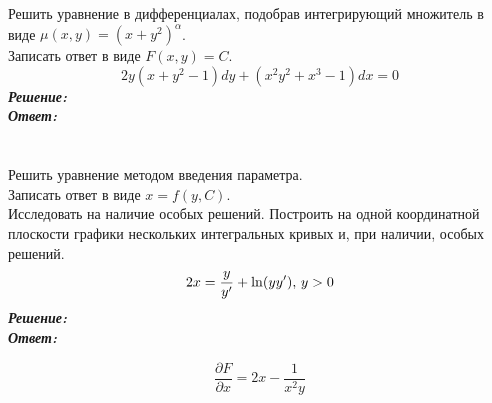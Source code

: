 \documentclass[a5paper, 10pt]{article}
\theoremstyle{definition}
\theoremstyle{plain}
\theoremstyle{remark}
\begin{document}
\newpage
\section{}
Решить уравнение в дифференциалах, подобрав интегрирующий множитель в виде $\mu (x, y) = (x+y^2)^{\alpha}$.\\
Записать ответ в виде $F(x, y) = C$.
\begin{equation*}
2y(x + y^2 - 1) dy + (x^2y^2+x^3 - 1)dx = 0
\end{equation*}
\textit{\textbf{Решение:}}\\


\textit{\textbf{Ответ:}}

\newpage
\section{}
Решить уравнение методом введения параметра. \\
Записать ответ в виде $x = f(y, C)$.\\
Исследовать на наличие особых решений. Построить на одной координатной плоскости графики нескольких интегральных кривых и, при наличии, особых решений.
\begin{equation*}
2x = \frac{y}{y'} + \ln (yy'), \, y >0\\
\end{equation*}
\textit{\textbf{Решение:}}\\


\textit{\textbf{Ответ:}}


\begin{equation*}
\frac{\partial F}{\partial x} =  2x - \frac{1}{x^2y}
\end{equation*}
\end{document}
